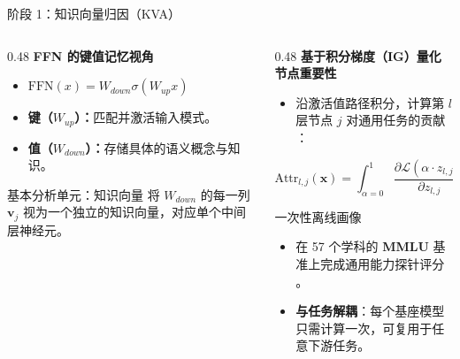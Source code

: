\documentclass{beamer}
\begin{document}
    \begin{frame}{阶段 1：知识向量归因（KVA）}
        \begin{columns}[T]
            \begin{column}{0.48\textwidth}
                \textbf{FFN 的键值记忆视角} \cite{geva2021}
                \begin{itemize}
                    \item \(\text{FFN}(x) = W_{down} \sigma(W_{up} x)\)
                    \item \textbf{键（$W_{up}$）：}匹配并激活输入模式。
                    \item \textbf{值（$W_{down}$）：}存储具体的语义概念与知识。
                \end{itemize}

                \begin{block}{基本分析单元：知识向量}
                    将 $W_{down}$ 的每一列 $\mathbf{v}_j$ 视为一个独立的\alert{知识向量}，对应单个中间层神经元。
                \end{block}
            \end{column}

            \begin{column}{0.48\textwidth}
                \textbf{基于积分梯度（IG）量化节点重要性}
                \begin{itemize}
                    \item 沿激活值路径积分，计算第 $l$ 层节点 $j$ 对通用任务的贡献 \cite{sundararajan2017}：
                \end{itemize}
                \vspace{-0.2em}
                \begin{equation*}
                    \text{Attr}_{l,j}(\mathbf{x}) = \int_{\alpha=0}^{1} \frac{\partial \mathcal{L}(\alpha \cdot z_{l,j})}{\partial z_{l,j}} d\alpha
                \end{equation*}
                \vspace{-0.4em}
                \begin{alertblock}{一次性离线画像}
                    \begin{itemize}
                        \item 在 57 个学科的 \textbf{MMLU} 基准上完成通用能力探针评分 \cite{kemker2018b}。
                        \item \textbf{与任务解耦}：每个基座模型只需计算一次，可复用于任意下游任务。
                    \end{itemize}
                \end{alertblock}
            \end{column}
        \end{columns}
    \end{frame}
\end{document}
